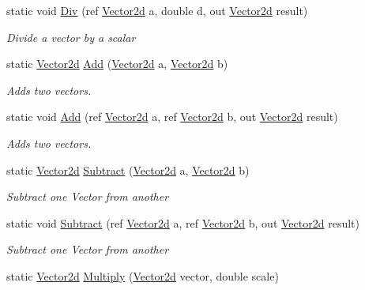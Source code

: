 \begin{DoxyCompactItemize}
static void \hyperlink{struct_open_t_k_1_1_vector2d_ad8c7eec2c10ebe396e8d2b932ed00706}{Div} (ref \hyperlink{struct_open_t_k_1_1_vector2d}{Vector2d} a, double d, out \hyperlink{struct_open_t_k_1_1_vector2d}{Vector2d} result)
\begin{DoxyCompactList}\small\item\em Divide a vector by a scalar \end{DoxyCompactList}\item 
static \hyperlink{struct_open_t_k_1_1_vector2d}{Vector2d} \hyperlink{struct_open_t_k_1_1_vector2d_a6b293e21fb885643fbf2c3a516e82a25}{Add} (\hyperlink{struct_open_t_k_1_1_vector2d}{Vector2d} a, \hyperlink{struct_open_t_k_1_1_vector2d}{Vector2d} b)
\begin{DoxyCompactList}\small\item\em Adds two vectors. \end{DoxyCompactList}\item 
static void \hyperlink{struct_open_t_k_1_1_vector2d_ae1dff815a79e5cd41c5b76cff5a52ad8}{Add} (ref \hyperlink{struct_open_t_k_1_1_vector2d}{Vector2d} a, ref \hyperlink{struct_open_t_k_1_1_vector2d}{Vector2d} b, out \hyperlink{struct_open_t_k_1_1_vector2d}{Vector2d} result)
\begin{DoxyCompactList}\small\item\em Adds two vectors. \end{DoxyCompactList}\item 
static \hyperlink{struct_open_t_k_1_1_vector2d}{Vector2d} \hyperlink{struct_open_t_k_1_1_vector2d_a0b6e92bd9dda7a083b2efa24f55f93c2}{Subtract} (\hyperlink{struct_open_t_k_1_1_vector2d}{Vector2d} a, \hyperlink{struct_open_t_k_1_1_vector2d}{Vector2d} b)
\begin{DoxyCompactList}\small\item\em Subtract one Vector from another \end{DoxyCompactList}\item 
static void \hyperlink{struct_open_t_k_1_1_vector2d_a003dd00f3eee8b0f12870e1c514e7912}{Subtract} (ref \hyperlink{struct_open_t_k_1_1_vector2d}{Vector2d} a, ref \hyperlink{struct_open_t_k_1_1_vector2d}{Vector2d} b, out \hyperlink{struct_open_t_k_1_1_vector2d}{Vector2d} result)
\begin{DoxyCompactList}\small\item\em Subtract one Vector from another \end{DoxyCompactList}\item 
static \hyperlink{struct_open_t_k_1_1_vector2d}{Vector2d} \hyperlink{struct_open_t_k_1_1_vector2d_a1844f648753c7458a611c6b4c64573c5}{Multiply} (\hyperlink{struct_open_t_k_1_1_vector2d}{Vector2d} vector, double scale)

\end{DoxyCompactItemize}
